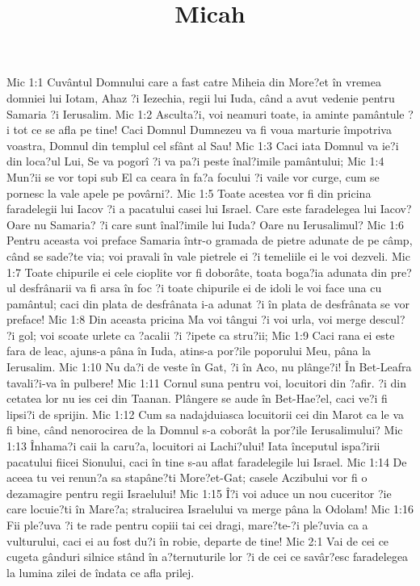 

\title{Micah}

Mic 1:1  Cuvântul Domnului care a fast catre Miheia din More?et în vremea domniei lui Iotam, Ahaz ?i Iezechia, regii lui Iuda, când a avut vedenie pentru Samaria ?i Ierusalim.
Mic 1:2  Asculta?i, voi neamuri toate, ia aminte pamântule ?i tot ce se afla pe tine! Caci Domnul Dumnezeu va fi voua marturie împotriva voastra, Domnul din templul cel sfânt al Sau!
Mic 1:3  Caci iata Domnul va ie?i din loca?ul Lui, Se va pogorî ?i va pa?i peste înal?imile pamântului;
Mic 1:4  Mun?ii se vor topi sub El ca ceara în fa?a focului ?i vaile vor curge, cum se pornesc la vale apele pe povârni?.
Mic 1:5  Toate acestea vor fi din pricina faradelegii lui Iacov ?i a pacatului casei lui Israel. Care este faradelegea lui Iacov? Oare nu Samaria? ?i care sunt înal?imile lui Iuda? Oare nu Ierusalimul?
Mic 1:6  Pentru aceasta voi preface Samaria într-o gramada de pietre adunate de pe câmp, când se sade?te via; voi pravali în vale pietrele ei ?i temeliile ei le voi dezveli.
Mic 1:7  Toate chipurile ei cele cioplite vor fi doborâte, toata boga?ia adunata din pre?ul desfrânarii va fi arsa în foc ?i toate chipurile ei de idoli le voi face una cu pamântul; caci din plata de desfrânata i-a adunat ?i în plata de desfrânata se vor preface!
Mic 1:8  Din aceasta pricina Ma voi tângui ?i voi urla, voi merge descul? ?i gol; voi scoate urlete ca ?acalii ?i ?ipete ca stru?ii;
Mic 1:9  Caci rana ei este fara de leac, ajuns-a pâna în Iuda, atins-a por?ile poporului Meu, pâna la Ierusalim.
Mic 1:10  Nu da?i de veste în Gat, ?i în Aco, nu plânge?i! În Bet-Leafra tavali?i-va în pulbere!
Mic 1:11  Cornul suna pentru voi, locuitori din ?afir. ?i din cetatea lor nu ies cei din Taanan. Plângere se aude în Bet-Hae?el, caci ve?i fi lipsi?i de sprijin.
Mic 1:12  Cum sa nadajduiasca locuitorii cei din Marot ca le va fi bine, când nenorocirea de la Domnul s-a coborât la por?ile Ierusalimului?
Mic 1:13  Înhama?i caii la caru?a, locuitori ai Lachi?ului! Iata începutul ispa?irii pacatului fiicei Sionului, caci în tine s-au aflat faradelegile lui Israel.
Mic 1:14  De aceea tu vei renun?a sa stapâne?ti More?et-Gat; casele Aczibului vor fi o dezamagire pentru regii Israelului!
Mic 1:15  Î?i voi aduce un nou cuceritor ?ie care locuie?ti în Mare?a; stralucirea Israelului va merge pâna la Odolam!
Mic 1:16  Fii ple?uva ?i te rade pentru copiii tai cei dragi, mare?te-?i ple?uvia ca a vulturului, caci ei au fost du?i în robie, departe de tine!
Mic 2:1  Vai de cei ce cugeta gânduri silnice stând în a?ternuturile lor ?i de cei ce savâr?esc faradelegea la lumina zilei de îndata ce afla prilej.
